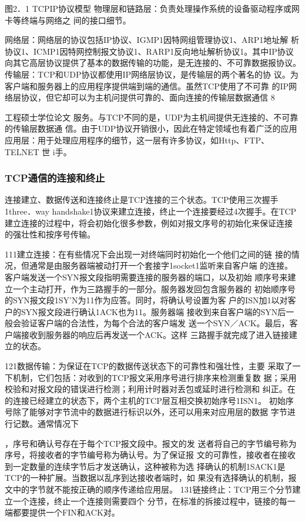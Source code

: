 图2．1 TCPIP协议模型
物理层和链路层：负责处理操作系统的设备驱动程序或网卡等终端与网络之
间的接口细节。

网络层：网络层的协议包括IP协议、IGMP1因特网组管理协议1、ARP1地址解
析协议1、ICMP1因特网控制报文协议1、RARP1反向地址解析协议1。其中IP协议
向其它高层协议提供了基本的数据传输的功能，是无连接的、不可靠数据报协议。
传输层：TCP和UDP协议都使用IP网络层协议，是传输层的两个著名的协
议。为客户端和服务器上的应用程序提供端到端的通信。虽然TCP使用了不可靠
的IP网络层协议，但它却可以为主机问提供可靠的、面向连接的传输层数据通信
8

工程硕士学位论文
服务。与TCP不同的是，UDP为主机间提供无连接的、不可靠的传输层数据通
信。由于UDP协议开销很小，因此在特定领域也有着广泛的应用
应用层：用于处理应用程序的细节，这一层有许多协议，如Http、FTP、TELNET
世
i手。
\subsubsection*{TCP通信的连接和终止}
连接建立、数据传送和连接终止是TCP连接的三个状态。TCP使用三次握手
1three．way handshake1协议来建立连接，终止一个连接要经过4次握手。在TCP
建立连接的过程中，将会初始化很多参数，例如对报文序号的初始化来保证连接
的强壮性和按序号传输。

111建立连接：在有些情况下会出现一对终端同时初始化一个他们之间的链
接的情况，但通常是由服务器端被动打开一个套接字1socket1监听来自客户端
的连接。客户端发送一个SYN报文段指明需要连接的服务器的端口，以及初始
顺序号来建立一个主动打开，作为三路握手的一部分。服务器发回包含服务器的
初始顺序号的SYN报文段1SY'N为11作为应答。同时，将确认号设置为客
户的ISN加1以对客户的SYN报文段进行确认1ACK也为11。服务器端
接收到来自客户端的SYN后一般会验证客户端的合法性，为每个合法的客户端发
送一个SYN／ACK。最后，客户端接收到服务器的响应后再发送一个ACK。这样
三路握手就完成了进入链接建立的状态。

121数据传输：为保证在TCP的数据传送状态下的可靠性和强壮性，主要
采取了一下机制，它们包括：对收到的TCP报文采用序号进行排序来检测重复数
据；采用校验和对报文段的错误进行检测；利用计时器对丢包或延时进行检测和
纠正。在的连接已经建立的状态下，两个主机的TCP层互相交换初始序号1ISN1。
初始序号除了能够对字节流中的数据进行标识以外，还可以用来对应用层的数据
字节进行记数。通常情况下

，序号和确认号存在于每个TCP报文段中。报文的发
送者将自己的字节编号称为序号，将接收者的字节编号称为确认号。为了保证报
文的可靠性，接收者在接收到一定数量的连续字节后才发送确认，这种被称为选
择确认的机制1SACK1是TCP的一种扩展。当数据以乱序到达接收者端时，如
果没有选择确认的机制，报文中的字节就不能按正确的顺序传递给应用层。
131链接终止：TCP用三个分节建立一个连接，终止一个连接则需要四个
分节，在标准的拆接过程中，链接的每一端都要提供一个FIN和ACK对。
